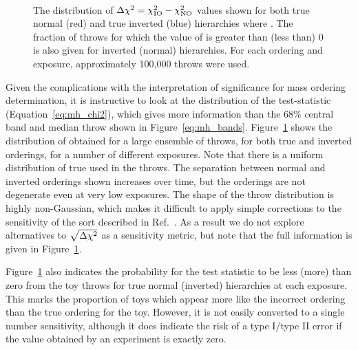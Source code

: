 \begin{figure*}[htbp]
  \centering
  \\
  \caption{The distribution of $\Delta\chi^{2} = \chi^{2}_{\mathrm{IO}} - \chi^{2}_{\mathrm{NO}}$ values shown for both true normal (red) and true inverted (blue) hierarchies where . The fraction of throws for which the value of \dchisq is greater than (less than) 0 is also given for inverted (normal) hierarchies. For each ordering and exposure, approximately 100,000 throws were used.}
  \label{fig:mh_comp_over_time}
\end{figure*}
Given the complications with the interpretation of significance for mass ordering determination, it is instructive to look at the distribution of the test-statistic (Equation~\ref{eq:mh_chi2}), which gives more information than the 68\% central band and median throw shown in Figure~\ref{eq:mh_bands}. Figure~\ref{fig:mh_comp_over_time} shows the distribution of \dchisq obtained for a large ensemble of throws, for both true and inverted orderings, for a number of different exposures. Note that there is a uniform distribution of true \deltacp used in the throws. The separation between normal and inverted orderings shown increases over time, but the orderings are not degenerate even at very low exposures. The shape of the throw distribution is highly non-Gaussian, which makes it difficult to apply simple corrections to the sensitivity of the sort described in Ref.~\cite{Blennow:2013oma}. As a result we do not explore alternatives to $\sqrt{\Delta\chi^{2}}$ as a sensitivity metric, but note that the full information is given in Figure~\ref{fig:mh_comp_over_time}.

Figure~\ref{fig:mh_comp_over_time} also indicates the probability for the test statistic \dchisq to be less (more) than zero from the toy throws for true normal (inverted) hierarchies at each exposure. This marks the proportion of toys which appear more like the incorrect ordering than the true ordering for the toy. However, it is not easily converted to a single number sensitivity, although it does indicate the risk of a type I/type II error if the \dchisq value obtained by an experiment is exactly zero.


